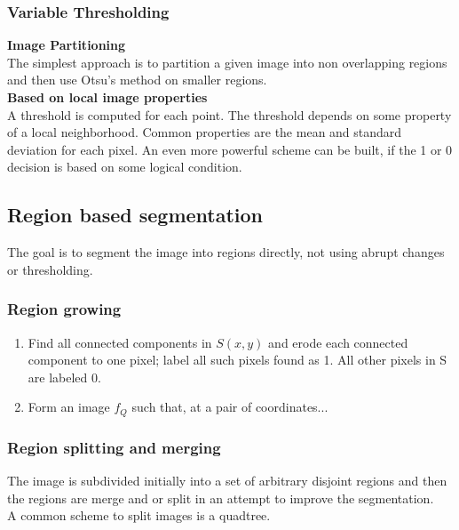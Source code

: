 \subsubsection{Variable Thresholding}
\textbf{Image Partitioning}\\
The simplest approach is to partition a given image into non overlapping regions and then use Otsu's method on smaller regions.\\
\textbf{Based on local image properties}\\
A threshold is computed for each point. The threshold depends on some property of a local neighborhood. Common properties are the mean and standard deviation for each pixel.
An even more powerful scheme can be built, if the 1 or 0 decision is based on some logical condition.\\

\subsection{Region based segmentation}
The goal is to segment the image into regions directly, not using abrupt changes or thresholding.
\subsubsection{Region growing}
\begin{enumerate}
\item Find all connected components in $S(x,y)$ and erode each connected component to one pixel; label all such pixels found as 1. All other pixels in S are labeled 0.
\item Form an image $f_Q$ such that, at a pair of coordinates...
\end{enumerate}
\subsubsection{Region splitting and merging}
The image is subdivided initially into a set of arbitrary disjoint regions and then the regions are merge and or split in an attempt to improve the segmentation.\\
A common scheme to split images is a quadtree.\\
